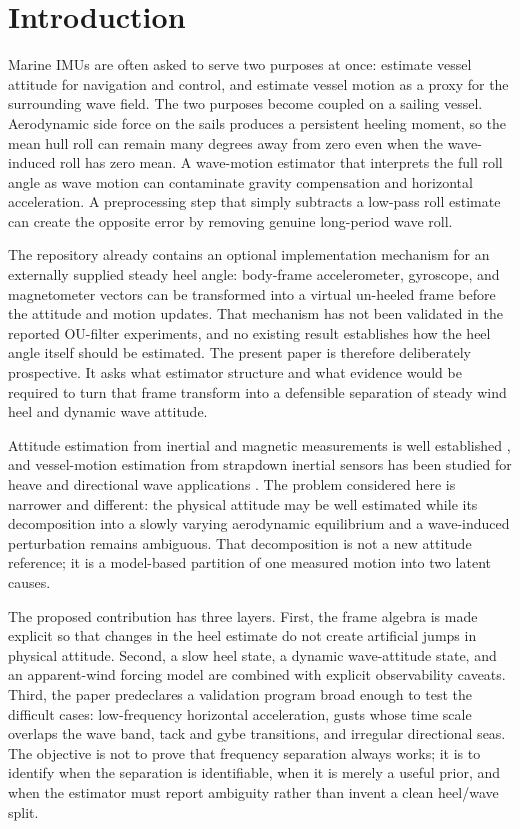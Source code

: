 \documentclass[conference]{IEEEtran}
\begin{document}
\section{Introduction}
\label{sec:introduction}

Marine IMUs are often asked to serve two purposes at once: estimate vessel attitude for
navigation and control, and estimate vessel motion as a proxy for the surrounding wave
field. The two purposes become coupled on a sailing vessel. Aerodynamic side force on
the sails produces a persistent heeling moment, so the mean hull roll can remain many
degrees away from zero even when the wave-induced roll has zero mean. A wave-motion
estimator that interprets the full roll angle as wave motion can contaminate gravity
compensation and horizontal acceleration. A preprocessing step that simply subtracts a
low-pass roll estimate can create the opposite error by removing genuine long-period
wave roll.

The repository already contains an optional implementation mechanism for an externally
supplied steady heel angle: body-frame accelerometer, gyroscope, and magnetometer vectors
can be transformed into a virtual un-heeled frame before the attitude and motion updates.
That mechanism has not been validated in the reported OU-filter experiments, and no
existing result establishes how the heel angle itself should be estimated. The present
paper is therefore deliberately prospective. It asks what estimator structure and what
evidence would be required to turn that frame transform into a defensible separation of
steady wind heel and dynamic wave attitude.

Attitude estimation from inertial and magnetic measurements is well established
\cite{Markley2003AttitudeError,MarkleyCrassidis2014_Attitude,Sola2017_QuaternionESKF},
and vessel-motion estimation from strapdown inertial sensors has been studied for heave
and directional wave applications \cite{Auestad2013_HeaveStrapdownIMU,Pascoal2009_KalmanDirectionalSpectrum,YurovskyKudinov2025_IMUwaves}.
The problem considered here is narrower and different: the physical attitude may be
well estimated while its decomposition into a slowly varying aerodynamic equilibrium and
a wave-induced perturbation remains ambiguous. That decomposition is not a new attitude
reference; it is a model-based partition of one measured motion into two latent causes.

The proposed contribution has three layers. First, the frame algebra is made explicit so
that changes in the heel estimate do not create artificial jumps in physical attitude.
Second, a slow heel state, a dynamic wave-attitude state, and an apparent-wind forcing
model are combined with explicit observability caveats. Third, the paper predeclares a
validation program broad enough to test the difficult cases: low-frequency horizontal
acceleration, gusts whose time scale overlaps the wave band, tack and gybe transitions,
and irregular directional seas. The objective is not to prove that frequency separation
always works; it is to identify when the separation is identifiable, when it is merely a
useful prior, and when the estimator must report ambiguity rather than invent a clean
heel/wave split.
\end{document}
